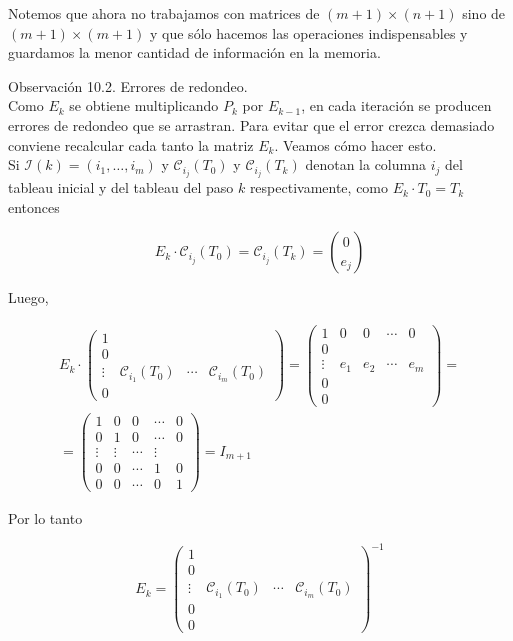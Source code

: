 \documentclass[10pt]{article}
\begin{document}
Notemos que ahora no trabajamos con matrices de $(m+1) \times(n+1)$ sino de $(m+1) \times(m+1)$ y que sólo hacemos las operaciones indispensables y guardamos la menor cantidad de información en la memoria.

Observación 10.2. Errores de redondeo.\\
Como $E_{k}$ se obtiene multiplicando $P_{k}$ por $E_{k-1}$, en cada iteración se producen errores de redondeo que se arrastran. Para evitar que el error crezca demasiado conviene recalcular cada tanto la matriz $E_{k}$. Veamos cómo hacer esto.\\
Si $\mathcal{I}(k)=\left(i_{1}, \ldots, i_{m}\right)$ y $\mathcal{C}_{i_{j}}\left(T_{0}\right)$ y $\mathcal{C}_{i_{j}}\left(T_{k}\right)$ denotan la columna $i_{j}$ del tableau inicial y del tableau del paso $k$ respectivamente, como $E_{k} \cdot T_{0}=T_{k}$ entonces

$$
E_{k} \cdot \mathcal{C}_{i_{j}}\left(T_{0}\right)=\mathcal{C}_{i_{j}}\left(T_{k}\right)=\binom{0}{e_{j}}
$$

Luego,

$$
\begin{gathered}
E_{k} \cdot\left(\begin{array}{llll}
1 & & \\
0 & & & \\
\vdots & \mathcal{C}_{i_{1}}\left(T_{0}\right) & \cdots & \mathcal{C}_{i_{m}}\left(T_{0}\right) \\
0 & &
\end{array}\right)=\left(\begin{array}{ccccc}
1 & 0 & 0 & \cdots & 0 \\
0 & & & & \\
\vdots & e_{1} & e_{2} & \cdots & e_{m} \\
0 & & & & \\
0 & & & &
\end{array}\right)= \\
=\left(\begin{array}{ccccc}
1 & 0 & 0 & \cdots & 0 \\
0 & 1 & 0 & \cdots & 0 \\
\vdots & \vdots & \cdots & \vdots & \\
0 & 0 & \cdots & 1 & 0 \\
0 & 0 & \cdots & 0 & 1
\end{array}\right)=I_{m+1}
\end{gathered}
$$

Por lo tanto

$$
E_{k}=\left(\begin{array}{llll}
1 & & & \\
0 & & & \\
\vdots & \mathcal{C}_{i_{1}}\left(T_{0}\right) & \cdots & \mathcal{C}_{i_{m}}\left(T_{0}\right) \\
0 & & & \\
0 & & &
\end{array}\right)^{-1}
$$
\end{document}
